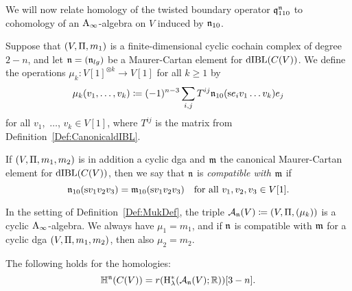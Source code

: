 \documentclass[\MainFolder/Text.tex]{subfiles}
\begin{document}
We will now relate homology of the twisted boundary operator $\mathfrak{q}_{110}^{\mathfrak{n}}$ to cohomology of an $\mathrm{A}_\infty$-algebra on $V$ induced by $\mathfrak{n}_{10}$. 
%

\begin{Definition}\label{Def:MukDef}
Suppose that $(V,\Pi,m_1)$ is a finite-dimensional cyclic cochain complex of degree $2-n$, and let $\mathfrak{n} = (\mathfrak{n}_{lg})$ be a Maurer-Cartan element for $\mathrm{dIBL}(C(V))$. We define the operations $\mu_k: V[1]^{\otimes k} \rightarrow V[1]$ for all $k\ge 1$ by
\begin{equation*}
\mu_k(v_1,\dotsc, v_k) \coloneqq (-1)^{n-3}\sum_{i, j} T^{ij} \mathfrak{n}_{10}(\mathrm{s} e_i v_1 \dots v_k) e_j
\end{equation*}
for all $v_1$,~$\dotsc$, $v_k \in V[1]$, where $T^{ij}$ is the matrix from Definition~\ref{Def:CanonicaldIBL}.

If $(V,\Pi,m_1,m_2)$ is in addition a cyclic dga and $\mathfrak{m}$ the canonical Maurer-Cartan element for $\mathrm{dIBL}(C(V))$, then we say that $\mathfrak{n}$ is \emph{compatible with $\mathfrak{m}$} if
$$ \mathfrak{n}_{10}(\mathrm{s} v_1 v_2 v_3) = \mathfrak{m}_{10}(\mathrm{s} v_1 v_2 v_3)\quad\text{for all }v_1, v_2, v_3 \in V[1]. $$
\end{Definition}


\begin{Proposition}\label{Prop:CyclicHom}
In the setting of Definition~\ref{Def:MukDef}, the triple $\mathcal{A}_{\mathfrak{n}}(V) \coloneqq (V,\Pi, (\mu_k))$ is a cyclic $\mathrm{A}_\infty$-algebra. We always have $\mu_1 = m_1$, and if $\mathfrak{n}$ is compatible with $\mathfrak{m}$ for a cyclic dga $(V,\Pi,m_1,m_2)$, then also $\mu_2 = m_2$. 

The following holds for the homologies:
\begin{equation*}
 \mathbb{H}^{\mathfrak{n}}(C(V))=  r(\mathrm{H}^*_\lambda(\mathcal{A}_{\mathfrak{n}}(V);\mathbb{R}))[3-n].
\end{equation*}
\end{Proposition}
\end{document}

